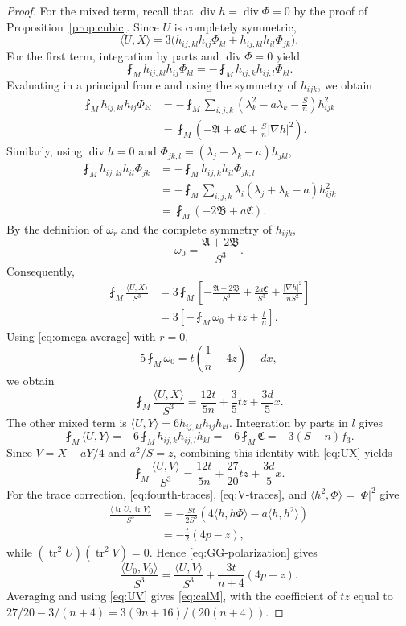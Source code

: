 \documentclass[10pt,a4paper]{amsart}
\numberwithin{equation}{section}
\newcommand{\tr}{\operatorname{tr}}
\newcommand{\diver}{\operatorname{div}}
\newcommand{\ip}[2]{\langle #1,#2\rangle}
\newcommand{\norm}[1]{\lvert #1\rvert}
\begin{document}
\begin{proof}
For the mixed term, recall that $\diver h=\diver\Phi=0$ by the proof of Proposition~\ref{prop:cubic}. Since $U$ is completely symmetric,
\[
\ip{U}{X}
=3\bigl(h_{ij,kl}h_{ij}\Phi_{kl}
+h_{ij,kl}h_{il}\Phi_{jk}\bigr).
\]
For the first term, integration by parts and $\diver\Phi=0$ yield
\[
\fint_M h_{ij,kl}h_{ij}\Phi_{kl}
=-\fint_M h_{ij,k}h_{ij,l}\Phi_{kl}.
\]
Evaluating in a principal frame and using the symmetry of $h_{ijk}$, we obtain
\begin{align*}
\fint_M h_{ij,kl}h_{ij}\Phi_{kl}
&=-\fint_M\sum_{i,j,k}
\left(\lambda_k^2-a\lambda_k-\frac Sn\right)h_{ijk}^2\\
&=\fint_M\left(-\mathfrak A+a\mathfrak C
+\frac Sn\norm{\nabla h}^2\right).
\end{align*}
Similarly, using $\diver h=0$ and
$\Phi_{jk,l}=(\lambda_j+\lambda_k-a)h_{jkl}$,
\begin{align*}
\fint_M h_{ij,kl}h_{il}\Phi_{jk}
&=-\fint_M h_{ij,k}h_{il}\Phi_{jk,l}\\
&=-\fint_M\sum_{i,j,k}
\lambda_i(\lambda_j+\lambda_k-a)h_{ijk}^2\\
&=\fint_M(-2\mathfrak B+a\mathfrak C).
\end{align*}
By the definition of $\omega_r$ and the complete symmetry of $h_{ijk}$,
\[
\omega_0=\frac{\mathfrak A+2\mathfrak B}{S^3}.
\]
Consequently,
\begin{align*}
\fint_M\frac{\ip{U}{X}}{S^3}
&=
3\fint_M
\left[
-\frac{\mathfrak A+2\mathfrak B}{S^3}
+\frac{2a\mathfrak C}{S^3}
+\frac{\norm{\nabla h}^2}{nS^2}
\right]\\
&=
3\left[
-\fint_M\omega_0
+tz+\frac tn
\right].
\end{align*}
Using \eqref{eq:omega-average} with $r=0$,
\[
5\fint_M\omega_0=t\left(\frac1n+4z\right)-dx,
\]
we obtain
\begin{equation}\label{eq:UX}
\fint_M\frac{\ip{U}{X}}{S^3}
=\frac{12t}{5n}+\frac35tz+\frac{3d}{5}x.
\end{equation}
The other mixed term is $\ip UY=6h_{ij,kl}h_{ij}h_{kl}$. Integration by parts in $l$ gives
\[
\fint_M\ip UY
=-6\fint_M h_{ij,k}h_{ij,l}h_{kl}
=-6\fint_M\mathfrak C=-3(S-n)f_3.
\]
Since $V=X-aY/4$ and $a^2/S=z$, combining this identity with \eqref{eq:UX} yields
\begin{equation}\label{eq:UV}
\fint_M\frac{\ip{U}{V}}{S^3}
=\frac{12t}{5n}+\frac{27}{20}tz+\frac{3d}{5}x.
\end{equation}
For the trace correction, \eqref{eq:fourth-traces}, \eqref{eq:V-traces}, and $\ip{h^2}{\Phi}=\norm\Phi^2$ give
\begin{align*}
\frac{\ip{\tr U}{\tr V}}{S^3}
&=-\frac{St}{2S^3}
\left(4\ip{h}{h\Phi}-a\ip{h}{h^2}\right)\\
&=-\frac t2(4p-z),
\end{align*}
while $(\tr^2U)(\tr^2V)=0$. Hence \eqref{eq:GG-polarization} gives
\[
\frac{\ip{U_0}{V_0}}{S^3}
=\frac{\ip{U}{V}}{S^3}+\frac{3t}{n+4}(4p-z).
\]
Averaging and using \eqref{eq:UV} gives \eqref{eq:calM}, with the coefficient of $tz$ equal to $27/20-3/(n+4)=3(9n+16)/(20(n+4))$.


\end{proof}
\end{document}
